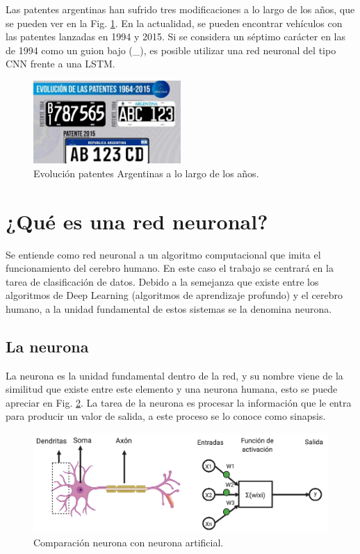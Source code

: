 Las patentes argentinas han sufrido tres modificaciones a lo largo de los años, que se pueden ver en la Fig. \ref{fig:patentes-arg}. En la actualidad, se pueden encontrar vehículos con las patentes lanzadas en 1994 y 2015. Si se considera un séptimo carácter en las de 1994 como un guion bajo (\_), es posible utilizar una red neuronal del tipo CNN frente a una LSTM.
\begin{figure}[bth]
    \centering
    \includegraphics[width=0.5\textwidth]{imgs/patentes-arg.png}
    \caption{Evolución patentes Argentinas a lo largo de los años.}
    \label{fig:patentes-arg}
\end{figure}


\section{¿Qué es una red neuronal?}

Se entiende como red neuronal a un algoritmo computacional que imita el funcionamiento del cerebro humano.
En este caso el trabajo se centrará en la tarea de clasificación de datos.
Debido a la semejanza que existe entre los algoritmos de Deep Learning \cite{ibm_que_nodate} (algoritmos de aprendizaje profundo) y el cerebro humano, a la unidad fundamental de estos sistemas se la denomina neurona.


\subsection{La neurona}

La neurona es la unidad fundamental dentro de la red, y su nombre viene de la similitud que existe entre este elemento y una neurona humana, esto se puede apreciar en Fig. \ref{fig:comparativa-neuronas}. La tarea de la neurona es procesar la información que le entra para producir un valor de salida, a este proceso se lo conoce como sinapsis.

\begin{figure}[bth]
    \centering
    \includegraphics[width=1\textwidth]{imgs/comparacion-neurona-red.png}
    \caption{Comparación neurona con neurona artificial.}
    \label{fig:comparativa-neuronas}
\end{figure}

